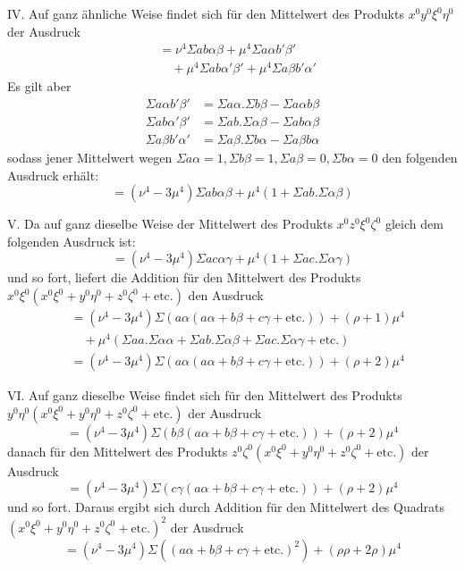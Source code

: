 IV. Auf ganz ähnliche Weise findet sich für den Mittelwert des Produkts \(x^0y^0\xi^0\eta^0\) der Ausdruck
\[
\begin{aligned}
&=\nu^4\Sigma ab\alpha\beta+\mu^4\Sigma a\alpha b'\beta'\\
&\quad+\mu^4\Sigma ab\alpha'\beta'+\mu^4\Sigma a\beta b'\alpha'
\end{aligned}
\]
Es gilt aber
\[
\begin{aligned}
\Sigma a\alpha b'\beta'&=\Sigma a\alpha.\Sigma b\beta-\Sigma a\alpha b\beta\\
\Sigma ab\alpha'\beta'&=\Sigma ab.\Sigma\alpha\beta-\Sigma ab\alpha\beta\\
\Sigma a\beta b'\alpha'&=\Sigma a\beta.\Sigma b\alpha-\Sigma a\beta b\alpha
\end{aligned}
\]
sodass jener Mittelwert wegen \(\Sigma a\alpha=1,\allowbreak\Sigma b\beta=1,\allowbreak\Sigma a\beta=0,\allowbreak\Sigma b\alpha=0\) den folgenden Ausdruck erhält:
\[
=(\nu^4-3\mu^4)\Sigma ab\alpha\beta+\mu^4(1+\Sigma ab.\Sigma\alpha\beta)
\]

V. Da auf ganz dieselbe Weise der Mittelwert des Produkts \(x^0z^0\xi^0\zeta^0\) gleich dem folgenden Ausdruck ist:
\[
=(\nu^4-3\mu^4)\Sigma ac\alpha\gamma+\mu^4(1+\Sigma ac.\Sigma\alpha\gamma)
\]
und so fort, liefert die Addition für den Mittelwert des Produkts \(x^0\xi^0(x^0\xi^0+y^0\eta^0+z^0\zeta^0+\text{etc.})\) den Ausdruck
\[
\begin{aligned}
&=(\nu^4-3\mu^4)\Sigma(a\alpha(a\alpha+b\beta+c\gamma+\text{etc.}))+(\rho+1)\mu^4\\
&\quad+\mu^4(\Sigma aa.\Sigma\alpha\alpha+\Sigma ab.\Sigma\alpha\beta+\Sigma ac.\Sigma\alpha\gamma+\text{etc.})\\
&=(\nu^4-3\mu^4)\Sigma(a\alpha(a\alpha+b\beta+c\gamma+\text{etc.}))+(\rho+2)\mu^4
\end{aligned}
\]

VI. Auf ganz dieselbe Weise findet sich für den Mittelwert des Produkts \(y^0\eta^0(x^0\xi^0+y^0\eta^0+z^0\zeta^0+\text{etc.})\) der Ausdruck
\[
=(\nu^4-3\mu^4)\Sigma(b\beta(a\alpha+b\beta+c\gamma+\text{etc.}))+(\rho+2)\mu^4
\]
danach für den Mittelwert des Produkts \(z^0\zeta^0(x^0\xi^0+y^0\eta^0+z^0\zeta^0+\text{etc.})\) der Ausdruck
\[
=(\nu^4-3\mu^4)\Sigma(c\gamma(a\alpha+b\beta+c\gamma+\text{etc.}))+(\rho+2)\mu^4
\]
und so fort. Daraus ergibt sich durch Addition für den Mittelwert des Quadrats \((x^0\xi^0+y^0\eta^0+z^0\zeta^0+\text{etc.})^2\) der Ausdruck
\[
=(\nu^4-3\mu^4)\Sigma((a\alpha+b\beta+c\gamma+\text{etc.})^2)+(\rho\rho+2\rho)\mu^4
\]

